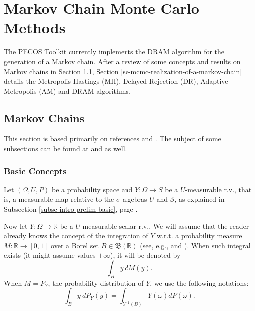 \chapter{Markov Chain Monte Carlo Methods}\label{ch-mcmc}
\thispagestyle{headings}

The PECOS Toolkit currently implements the DRAM algorithm \cite{HaLaMiSa06} for the generation of a Markov chain.
After a review of some concepts and results on Markov chains in Section \ref{sc-mcmc-markov-chains},
Section \ref{sc-mcmc-realization-of-a-markov-chain} details the
Metropolis-Hastings (MH),
Delayed Rejection (DR),
Adaptive Metropolis (AM) and
DRAM algorithms.

\section{Markov Chains}\label{sc-mcmc-markov-chains}

This section 
is based primarily on references \cite{Du05} and \cite{JaPr04}.
The subject of some subsections can be found at \cite{KaSo05} and \cite{Ro96} as well.

\subsection{Basic Concepts}

Let $(\Omega,U,P)$ be a probability space and $Y:\Omega\rightarrow S$ be a $U$-measurable r.v.,
that is, a measurable map relative to the $\sigma$-algebras $U$ and $\mathcal{S}$,
as explained in Subsection \ref{subsc-intro-prelim-basic}, page \pageref{subsc-intro-prelim-basic}.

Now let $Y:\Omega\rightarrow\mathbb{R}$ be a $U$-measurable scalar r.v..
We will assume that the reader already knows the concept of the
integration of $Y$
w.r.t. a probability measure $M:\mathbb{R}\rightarrow [0,1]$
over a Borel set $B\in\mathfrak{B}(\mathbb{R})$ (see, e.g., \cite[Section A.4]{Du05} and \cite[Chapter 9]{JaPr04}).
When such integral exists (it might assume values $\pm\infty$), it will be denoted by
\begin{equation*}
\int_B y~dM(y).
\end{equation*}
When $M=P_Y$, the probability distribution of $Y$, we use the following notations:
\begin{equation*}
\int_B y~dP_Y(y) = 
\int_{Y^{-1}(B)}Y(\omega)dP(\omega).
\end{equation*}

